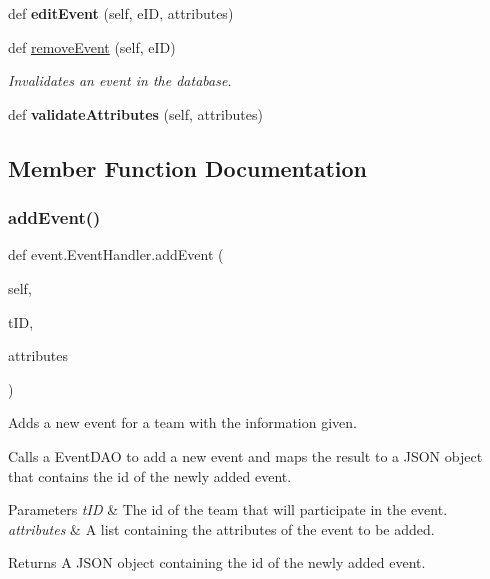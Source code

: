 \begin{DoxyCompactItemize}
\mbox{\label{classevent_1_1_event_handler_a4c4c5283fb74996d374db9474ffd36fd}} 
def {\bfseries edit\+Event} (self, e\+ID, attributes)
\item 
def \hyperlink{classevent_1_1_event_handler_ac5f0b0f70fec862ce67c7654cef30b27}{remove\+Event} (self, e\+ID)
\begin{DoxyCompactList}\small\item\em Invalidates an event in the database. \end{DoxyCompactList}\item 
\mbox{\label{classevent_1_1_event_handler_a63b8308aea6d532ea23628547758a240}} 
def {\bfseries validate\+Attributes} (self, attributes)
\end{DoxyCompactItemize}


\subsection{Member Function Documentation}
\mbox{\label{classevent_1_1_event_handler_a91ff7b7d00a5bcfd7499610163b80ac9}} 
\subsubsection{\texorpdfstring{add\+Event()}{addEvent()}}
{\footnotesize\ttfamily def event.\+Event\+Handler.\+add\+Event (\begin{DoxyParamCaption}\item[{}]{self,  }\item[{}]{t\+ID,  }\item[{}]{attributes }\end{DoxyParamCaption})}



Adds a new event for a team with the information given. 

Calls a Event\+D\+AO to add a new event and maps the result to a J\+S\+ON object that contains the id of the newly added event.


\begin{DoxyParams}{Parameters}
{\em t\+ID} & The id of the team that will participate in the event. \\
\hline
{\em attributes} & A list containing the attributes of the event to be added. \\
\hline
\end{DoxyParams}
\begin{DoxyReturn}{Returns}
A J\+S\+ON object containing the id of the newly added event. 
\end{DoxyReturn}
\mbox{\label{classevent_1_1_event_handler_ac6cc2fd97711012b1d86ca10803baa37}} 
